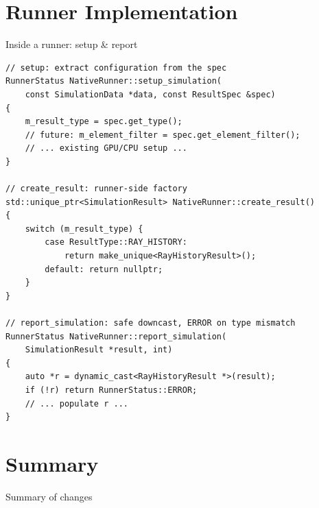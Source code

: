 \documentclass{beamer}
\begin{document}
\section{Runner Implementation}

\begin{frame}[fragile,shrink=5]{Inside a runner: setup \& report}
\begin{lstlisting}
// setup: extract configuration from the spec
RunnerStatus NativeRunner::setup_simulation(
    const SimulationData *data, const ResultSpec &spec)
{
    m_result_type = spec.get_type();
    // future: m_element_filter = spec.get_element_filter();
    // ... existing GPU/CPU setup ...
}

// create_result: runner-side factory
std::unique_ptr<SimulationResult> NativeRunner::create_result()
{
    switch (m_result_type) {
        case ResultType::RAY_HISTORY:
            return make_unique<RayHistoryResult>();
        default: return nullptr;
    }
}

// report_simulation: safe downcast, ERROR on type mismatch
RunnerStatus NativeRunner::report_simulation(
    SimulationResult *result, int)
{
    auto *r = dynamic_cast<RayHistoryResult *>(result);
    if (!r) return RunnerStatus::ERROR;
    // ... populate r ...
}
\end{lstlisting}
\end{frame}

\section{Summary}

\begin{frame}{Summary of changes}
\end{frame}
\end{document}
